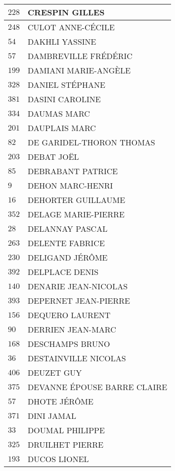 \begin{xltabular}{\linewidth}{|l|X|}
    \hline
    $228$ & CRESPIN GILLES \\
    \hline
    $248$ & CULOT ANNE-CÉCILE \\
    \hline
    $54$ & DAKHLI YASSINE \\
    \hline
    $57$ & DAMBREVILLE FRÉDÉRIC \\
    \hline
    $199$ & DAMIANI MARIE-ANGÈLE \\
    \hline
    $328$ & DANIEL STÉPHANE \\
    \hline
    $381$ & DASINI CAROLINE \\
    \hline
    $334$ & DAUMAS MARC \\
    \hline
    $201$ & DAUPLAIS MARC \\
    \hline
    $82$ & DE GARIDEL-THORON THOMAS \\
    \hline
    $203$ & DEBAT JOËL \\
    \hline
    $85$ & DEBRABANT PATRICE \\
    \hline
    $9$ & DEHON MARC-HENRI \\
    \hline
    $16$ & DEHORTER GUILLAUME \\
    \hline
    $352$ & DELAGE MARIE-PIERRE \\
    \hline
    $28$ & DELANNAY PASCAL \\
    \hline
    $263$ & DELENTE FABRICE \\
    \hline
    $230$ & DELIGAND JÉRÔME \\
    \hline
    $392$ & DELPLACE DENIS \\
    \hline
    $140$ & DENARIE JEAN-NICOLAS \\
    \hline
    $393$ & DEPERNET JEAN-PIERRE \\
    \hline
    $156$ & DEQUERO LAURENT \\
    \hline
    $90$ & DERRIEN JEAN-MARC \\
    \hline
    $168$ & DESCHAMPS BRUNO \\
    \hline
    $36$ & DESTAINVILLE NICOLAS \\
    \hline
    $406$ & DEUZET GUY \\
    \hline
    $375$ & DEVANNE ÉPOUSE BARRE CLAIRE \\
    \hline
    $57$ & DHOTE JÉRÔME \\
    \hline
    $371$ & DINI JAMAL \\
    \hline
    $33$ & DOUMAL PHILIPPE \\
    \hline
    $325$ & DRUILHET PIERRE \\
    \hline
    $193$ & DUCOS LIONEL \\

\end{xltabular}
